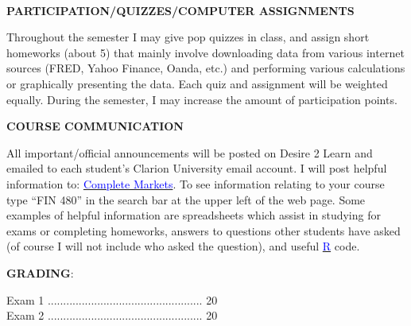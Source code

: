 \documentclass{article}
\begin{document}
\\
\begin{center}
{\bf PARTICIPATION/QUIZZES/COMPUTER ASSIGNMENTS}
\end{center}
Throughout the semester I may give pop quizzes in class, and assign short homeworks (about 5) that mainly involve downloading data from various internet sources (FRED, Yahoo Finance, Oanda, etc.) and performing various calculations or graphically presenting the data.  Each quiz and assignment will be weighted equally. During the semester, I may increase the amount of participation points.
\\
\begin{center}
{\bf COURSE COMMUNICATION}
\end{center}  
All important/official announcements will be posted on Desire 2 Learn and emailed to each student's Clarion University email account.  I will post helpful information to: \href{http://www.complete-markets.com}{\textcolor{blue}{Complete Markets}}.  To see information relating to your course type ``FIN 480'' in the search bar at the upper left of the web page.  Some examples of helpful information are spreadsheets which assist in studying for exams or completing homeworks, answers to questions other students have asked (of course I will not include who asked the question), and useful \href{http://www.r-project.org}{\textcolor{blue}{R}} code.
\\
\begin{center}
{\bf GRADING}:\\
\end{center}
Exam 1 ..................................................   20\\
Exam 2 ..................................................   20\\
\end{document}
